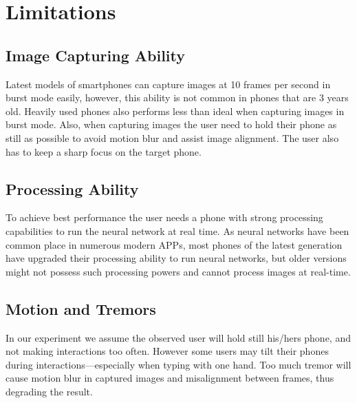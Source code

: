 \section{Limitations}
\subsection{Image Capturing Ability}
Latest models of smartphones can capture images at 10 frames per second in burst mode easily, however, this ability is not common in phones that are 3 years old. Heavily used phones also performs less than ideal when capturing images in burst mode. Also, when capturing images the user need to hold their phone as still as possible to avoid motion blur and assist image alignment. The user also has to keep a sharp focus on the target phone.
\subsection{Processing Ability}
To achieve best performance the user needs a phone with strong processing capabilities to run the neural network at real time. As neural networks have been common place in numerous modern APPs, most phones of the latest generation have upgraded their processing ability to run neural networks, but older versions might not possess such processing powers and cannot process images at real-time.
\subsection{Motion and Tremors}
In our experiment we assume the observed user will hold still his/hers phone, and not making interactions too often. However some users may tilt their phones during interactions—especially when typing with one hand. Too much tremor will cause motion blur in captured images and misalignment between frames, thus degrading the result.